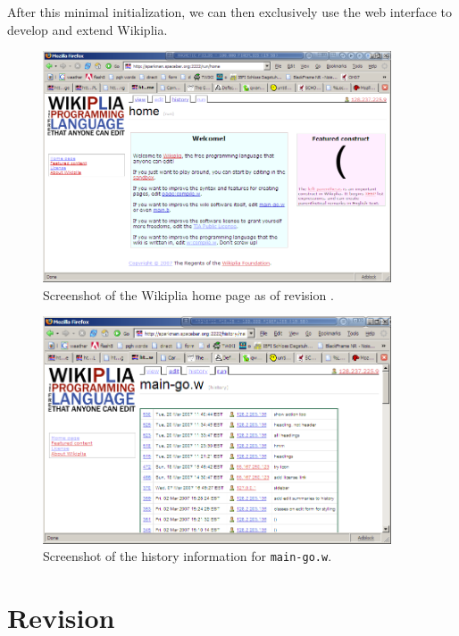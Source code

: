 \documentclass[twocolumn]{article}
\begin{document}
After this minimal initialization, we can then exclusively use the web
interface to develop and extend Wikiplia.

\begin{figure}[t]
\begin{center}
\includegraphics[width=0.92\textwidth]{ss_homepage}
\end{center}
\caption{Screenshot of the Wikiplia home page as of revision
\currentrevision.} \label{fig:sshomepage}
\end{figure}

\begin{figure}[t]
\begin{center}
\includegraphics[width=0.92\textwidth]{ss_history}
\end{center}
\caption{Screenshot of the history information for {\tt main-go.w}.
} \label{fig:sshistory}
\end{figure}

\section{Revision \currentrevision} \label{sec:current}
\end{document}
